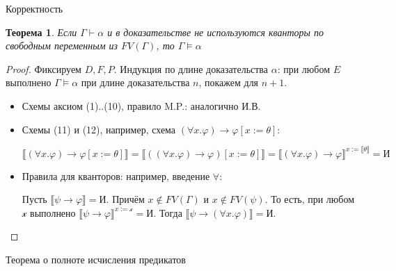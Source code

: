 \documentclass[aspectratio=169]{beamer}
\newtheorem{thm}{Теорема}[section]
\begin{document}
\begin{frame}{Корректность}
\begin{thm}Если $\Gamma \vdash \alpha$ и в доказательстве не используются кванторы по свободным переменным из $FV(\Gamma)$, то $\Gamma \models \alpha$\end{thm}
\begin{proof}Фиксируем $D, F, P$. Индукция по длине доказательства $\alpha$: при любом $E$ выполнено $\Gamma\models\alpha$ 
при длине доказательства $n$, покажем для $n+1$. 
\begin{itemize}
\item Схемы аксиом (1)..(10), правило M.P.: аналогично И.В.
\item Схемы (11) и (12), например, схема $(\forall x.\varphi) \rightarrow \varphi [x := \theta]$: \vspace{-0.6cm}

$$\llbracket (\forall x.\varphi) \rightarrow \varphi [x := \theta]\rrbracket = \llbracket ((\forall x.\varphi) \rightarrow \varphi) [x := \theta] \rrbracket =
  \llbracket (\forall x.\varphi) \rightarrow \varphi \rrbracket ^ { x := \llbracket\theta\rrbracket } = \text{И}$$

\item Правила для кванторов: например, введение $\forall$:

  Пусть $\llbracket \psi \rightarrow \varphi \rrbracket = \text{И}$. Причём $x \notin FV(\Gamma)$ и $x \notin FV(\psi)$. То есть,
  при любом $\mathcal{x}$ выполнено $\llbracket \psi \rightarrow \varphi \rrbracket^{x := \mathcal{x}} = \text{И}$. Тогда
  $\llbracket \psi \rightarrow (\forall x.\varphi) \rrbracket = \text{И}$.

\end{itemize}
\end{proof}
\end{frame}

\begin{frame}


\begin{center}\LARGE Теорема о полноте исчисления предикатов\end{center}

\end{frame}
\end{document}
